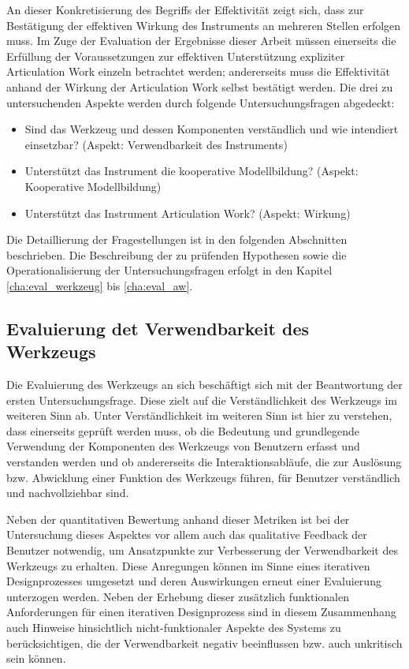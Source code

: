 An dieser Konkretisierung des Begriffs der Effektivität zeigt sich, dass zur Bestätigung der effektiven Wirkung des Instruments an mehreren Stellen erfolgen muss. Im Zuge der Evaluation der Ergebnisse dieser Arbeit müssen einerseits die Erfüllung der Voraussetzungen zur effektiven Unterstützung expliziter Articulation Work einzeln betrachtet werden; andererseits muss die Effektivität anhand der Wirkung der Articulation Work selbst bestätigt werden. Die drei zu untersuchenden Aspekte werden durch folgende Untersuchungsfragen abgedeckt:
\begin{itemize}
 \item Sind das Werkzeug und dessen Komponenten verständlich und wie intendiert einsetzbar? (Aspekt: Verwendbarkeit des Instruments)
 \item Unterstützt das Instrument die kooperative Modellbildung? (Aspekt: Kooperative Modellbildung)
 \item Unterstützt das Instrument Articulation Work? (Aspekt: Wirkung)
\end{itemize}

Die Detaillierung der Fragestellungen ist in den folgenden Abschnitten beschrieben. Die Beschreibung der zu prüfenden Hypothesen sowie die Operationalisierung der Untersuchungsfragen erfolgt in den Kapitel \ref{cha:eval_werkzeug} bis \ref{cha:eval_aw}.

\subsection{Evaluierung det Verwendbarkeit des Werkzeugs}
\label{sub:eval_werkzeug}

Die Evaluierung des Werkzeugs an sich beschäftigt sich mit der Beantwortung der ersten Untersuchungsfrage. Diese zielt auf die Verständlichkeit des Werkzeugs im weiteren Sinn ab. Unter Verständlichkeit im weiteren Sinn ist hier zu verstehen, dass einerseits geprüft werden muss, ob die Bedeutung und grundlegende Verwendung der Komponenten des Werkzeugs von Benutzern erfasst und verstanden werden und ob andererseits die Interaktionsabläufe, die zur Auslösung bzw. Abwicklung einer Funktion des Werkzeugs führen, für Benutzer verständlich und nachvollziehbar sind.

Neben der quantitativen Bewertung anhand dieser Metriken ist bei der Untersuchung dieses Aspektes vor allem auch das qualitative Feedback der Benutzer notwendig, um Ansatzpunkte zur Verbesserung der Verwendbarkeit des Werkzeugs zu erhalten. Diese Anregungen können im Sinne eines iterativen Designprozesses umgesetzt und deren Auswirkungen erneut einer Evaluierung unterzogen werden. Neben der Erhebung dieser zusätzlich funktionalen Anforderungen für einen iterativen Designprozess sind in diesem Zusammenhang auch Hinweise hinsichtlich nicht-funktionaler Aspekte des Systems zu berücksichtigen, die der Verwendbarkeit negativ beeinflussen bzw. auch unkritisch sein können.

